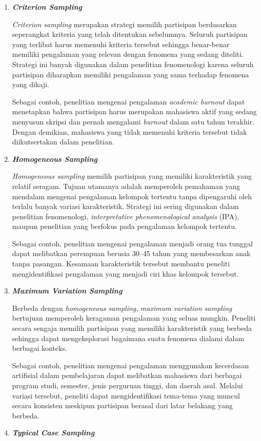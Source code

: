 \documentclass[
  indonesian,
  letterpaper,
  DIV=11,
  numbers=noendperiod]{scrreprt}
\begin{document}
\begin{enumerate}
\def\labelenumi{\arabic{enumi}.}
\item
  \textbf{\emph{Criterion Sampling}}

  \emph{Criterion sampling} merupakan strategi memilih partisipan
  berdasarkan seperangkat kriteria yang telah ditentukan sebelumnya.
  Seluruh partisipan yang terlibat harus memenuhi kriteria tersebut
  sehingga benar-benar memiliki pengalaman yang relevan dengan fenomena
  yang sedang diteliti. Strategi ini banyak digunakan dalam penelitian
  fenomenologi karena seluruh partisipan diharapkan memiliki pengalaman
  yang sama terhadap fenomena yang dikaji.

  Sebagai contoh, penelitian mengenai pengalaman \emph{academic burnout}
  dapat menetapkan bahwa partisipan harus merupakan mahasiswa aktif yang
  sedang menyusun skripsi dan pernah mengalami \emph{burnout} dalam satu
  tahun terakhir. Dengan demikian, mahasiswa yang tidak memenuhi
  kriteria tersebut tidak diikutsertakan dalam penelitian.
\item
  \textbf{\emph{Homogeneous Sampling}}

  \emph{Homogeneous sampling} memilih partisipan yang memiliki
  karakteristik yang relatif seragam. Tujuan utamanya adalah memperoleh
  pemahaman yang mendalam mengenai pengalaman kelompok tertentu tanpa
  dipengaruhi oleh terlalu banyak variasi karakteristik. Strategi ini
  sering digunakan dalam penelitian fenomenologi, \emph{interpretative
  phenomenological analysis} (IPA), maupun penelitian yang berfokus pada
  pengalaman kelompok tertentu.

  Sebagai contoh, penelitian mengenai pengalaman menjadi orang tua
  tunggal dapat melibatkan perempuan berusia 30--45 tahun yang
  membesarkan anak tanpa pasangan. Kesamaan karakteristik tersebut
  membantu peneliti mengidentifikasi pengalaman yang menjadi ciri khas
  kelompok tersebut.
\item
  \textbf{\emph{Maximum Variation Sampling}}

  Berbeda dengan \emph{homogeneous sampling}, \emph{maximum variation
  sampling} bertujuan memperoleh keragaman pengalaman yang seluas
  mungkin. Peneliti secara sengaja memilih partisipan yang memiliki
  karakteristik yang berbeda sehingga dapat mengeksplorasi bagaimana
  suatu fenomena dialami dalam berbagai konteks.

  Sebagai contoh, penelitian mengenai pengalaman menggunakan kecerdasan
  artifisial dalam pembelajaran dapat melibatkan mahasiswa dari berbagai
  program studi, semester, jenis perguruan tinggi, dan daerah asal.
  Melalui variasi tersebut, peneliti dapat mengidentifikasi tema-tema
  yang muncul secara konsisten meskipun partisipan berasal dari latar
  belakang yang berbeda.
\item
  \textbf{\emph{Typical Case Sampling}}


\end{enumerate}
\end{document}
